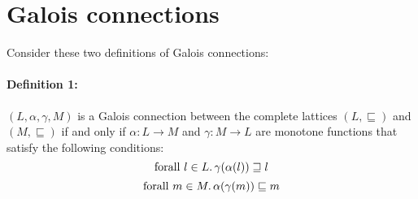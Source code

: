 \documentclass[11pt, oneside]{article}   	%
\begin{document}




\section{Galois connections}
Consider these two definitions of Galois connections:

\paragraph{Definition 1:}
$(L,\alpha,\gamma,M)$ is a Galois connection
between the complete lattices $(L,\sqsubseteq)$
and $(M,\sqsubseteq)$ if and only if
$\alpha:L \rightarrow M$ and $\gamma:M \rightarrow L$
are monotone functions that satisfy the following conditions:
$$\textrm{forall } l \in L \ldotp \gamma(\alpha(l)) \sqsupseteq l$$
$$\textrm{forall } m \in M \ldotp \alpha(\gamma(m)) \sqsubseteq m$$
\end{document}
